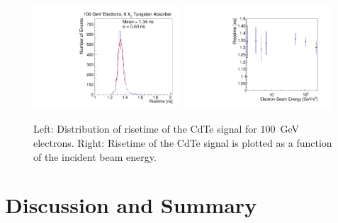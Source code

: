 \documentclass[preprint,1p]{elsarticle}
\begin{document}
\begin{figure}[htbp] 
\centering
\includegraphics[width=0.49\textwidth]{figures/100GeV_risetime.pdf} 
\includegraphics[width=0.49\textwidth]{figures/RisetimeVsEnergy.pdf} 
\caption{ Left: Distribution of risetime of the CdTe signal for $100$~GeV electrons. 
Right: Risetime of the CdTe signal is plotted as a function of the incident beam energy. } 
\label{fig:riseTime} 
\end{figure} 




\section{Discussion and Summary}
\label{sec:summary} 



\end{document}
